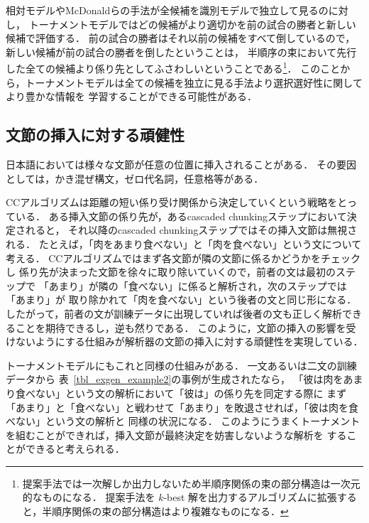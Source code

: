 \documentclass[japanese]{jnlp_1.4}
\begin{document}
相対モデルやMcDonaldらの手法が全候補を識別モデルで独立して見るのに対し，
トーナメントモデルではどの候補がより適切かを前の試合の勝者と新しい候補で評価する．
前の試合の勝者はそれ以前の候補をすべて倒しているので，新しい候補が前の試合の勝者を倒したということは，
半順序の束において先行した全ての候補より係り先としてふさわしいということである\footnote{
	提案手法では一次解しか出力しないため半順序関係の束の部分構造は一次元的なものになる．
	提案手法を $k$-best 解を出力するアルゴリズムに拡張すると，半順序関係の束の部分構造はより複雑なものになる．}．
このことから，トーナメントモデルは全ての候補を独立に見る手法より選択選好性に関してより豊かな情報を
学習することができる可能性がある．



\subsection{文節の挿入に対する頑健性}

日本語においては様々な文節が任意の位置に挿入されることがある．
その要因としては，かき混ぜ構文，ゼロ代名詞，任意格等がある．

CCアルゴリズムは距離の短い係り受け関係から決定していくという戦略をとっている．
ある挿入文節の係り先が，あるcascaded chunkingステップにおいて決定されると，
それ以降のcascaded chunkingステップではその挿入文節は無視される．
たとえば，「肉をあまり食べない」と「肉を食べない」という文について考える．
CCアルゴリズムではまず各文節が隣の文節に係るかどうかをチェックし
係り先が決まった文節を徐々に取り除いていくので，前者の文は最初のステップで
「あまり」が隣の「食べない」に係ると解析され，次のステップでは「あまり」が
取り除かれて「肉を食べない」という後者の文と同じ形になる．
したがって，前者の文が訓練データに出現していれば後者の文も正しく解析できることを期待できるし，逆も然りである．
このように，文節の挿入の影響を受けないようにする仕組みが解析器の文節の挿入に対する頑健性を実現している．

トーナメントモデルにもこれと同様の仕組みがある．
一文あるいは二文の訓練データから
\linebreak
表~\ref{tbl_exgen_example2}の事例が生成されたなら，
「彼は肉をあまり食べない」という文の解析において「彼は」の係り先を同定する際に
まず「あまり」と「食べない」と戦わせて「あまり」を敗退させれば，「彼は肉を食べない」という文の解析と
同様の状況になる．
このようにうまくトーナメントを組むことができれば，挿入文節が最終決定を妨害しないような解析を
することができると考えられる．

\begin{table}[t]
\begin{center}

\end{center}
\label{tbl_exgen_example2}
\end{table}
\end{document}
